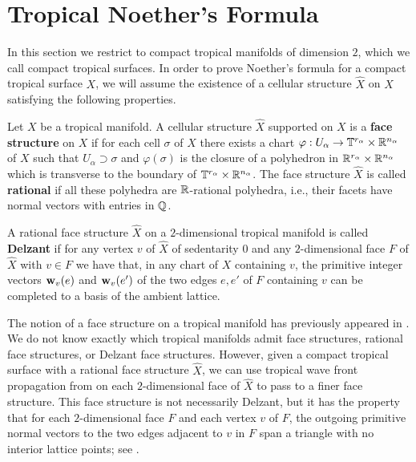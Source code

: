 

\section{Tropical Noether's Formula}\label{sec:Noether}

In this section we restrict to compact tropical manifolds of dimension $2$, which we call compact tropical surfaces. 
In order to prove Noether's formula for a compact tropical surface $X$,
we will assume the existence of a cellular structure $\hat{X}$ on $X$ satisfying the following properties. 

\begin{defi}\label{def:facestructure}
Let $X$ be a tropical manifold. A cellular structure $\hat{X}$ supported on $X$ is a {\bf face structure} on $X$ if 
for each cell $\sigma$ of $\hat{X}$ there exists 
a chart $\varphi: U_\alpha \to \mathbb{T}^{r_\alpha} \times \mathbb{R}^{n_\alpha}$ of $X$ such that $U_\alpha \supset \sigma$ and $\varphi(\sigma)$ is the closure of a polyhedron in $\mathbb{R}^{r_\alpha} \times \mathbb{R}^{n_\alpha}$ which is transverse to the boundary of $\mathbb{T}^{r_\alpha} \times \mathbb{R}^{n_\alpha}$. 
The face structure $\hat{X}$ is called {\bf rational} if all these polyhedra are ${\mathbb R}$-rational polyhedra, i.e., their facets have normal vectors with entries in ${\mathbb Q}$. 

A rational face structure $\hat X$ on a $2$-dimensional tropical manifold is called {\bf Delzant} if for any vertex $v$ of $\hat{X}$ of sedentarity 0 and any $2$-dimensional face $F$ of $\hat{X}$ with $v \in F$ we have that, in any chart of $X$ containing $v$, the primitive integer vectors $\mathbf w_v(e)$ and $\mathbf w_v(e')$ of the two edges $e, e'$ of $F$ containing $v$ can be completed to a basis of the ambient lattice. 
\end{defi}

\begin{rem}
The notion of a face structure on a tropical manifold has previously appeared in \cite{JRS}. 
We do not know exactly which tropical manifolds admit face structures, rational face structures, or Delzant face structures. 
However, given a compact tropical surface with a rational face structure $\hat{X}$,  we can use tropical wave front propagation from \cite{MikShk} on each $2$-dimensional  face of $\hat X$ to pass to a finer face structure. This face structure is not necessarily Delzant, but it has the property that for each $2$-dimensional face $F$ and each vertex $v$ of $F$, the outgoing primitive normal vectors to the two edges adjacent to $v$ in $F$ span a triangle with no interior lattice points; see  \cite{MikShk}. 
\end{rem}

